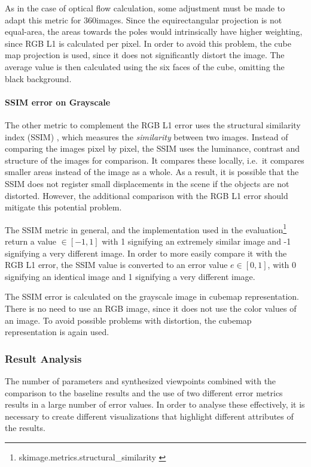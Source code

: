 As in the case of optical flow calculation, some adjustment must be made to adapt this metric for 360\degree images. Since the equirectangular projection is not equal-area, the areas towards the poles would intrinsically have higher weighting, since RGB L1 is calculated per pixel. In order to avoid this problem, the cube map projection is used, since it does not significantly distort the image. The average value is then calculated using the six faces of the cube, omitting the black background.

\paragraph{SSIM error on Grayscale}
The other metric to complement the RGB L1 error uses the structural similarity index (SSIM) \cite{ssim}, which measures the \emph{similarity} between two images. Instead of comparing the images pixel by pixel, the SSIM uses the luminance, contrast and structure of the images for comparison. It compares these locally, i.e.\ it compares smaller areas instead of the image as a whole. As a result, it is possible that the SSIM does not register small displacements in the scene if the objects are not distorted. However, the additional comparison with the RGB L1 error should mitigate this potential problem.

The SSIM metric in general, and the implementation used in the evaluation\footnote{skimage.metrics.structural\_similarity \cite{skimage}} return a value $\in [-1, 1]$ with 1 signifying an extremely similar image and -1 signifying a very different image. In order to more easily compare it with the RGB L1 error, the SSIM value is converted to an error value $ e \in [0,1]$, with 0 signifying an identical image and 1 signifying a very different image.

The SSIM error is calculated on the grayscale image in cubemap representation. There is no need to use an RGB image, since it does not use the color values of an image. To avoid possible problems with distortion, the cubemap representation is again used.

\subsubsection{Result Analysis}
The number of parameters and synthesized viewpoints combined with the comparison to the baseline results and the use of two different error metrics results in a large number of error values. In order to analyse these effectively, it is necessary to create different visualizations that highlight different attributes of the results.

